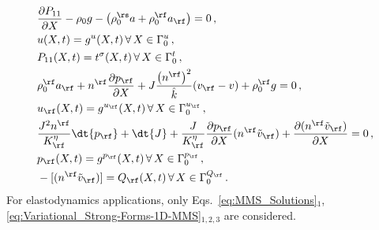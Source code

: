 \begin{align}
\label{eq:Variational_Strong-Forms-1D-MMS}
    \begin{aligned}
        &\frac{\partial P_{11}}{\partial X} - \rho_0g - \left(\rho_0^\rs a + \rho_0^\rf a_\rf\right) = 0\, ,\\
        &u(X, t) = g^u(X,t)\, \forall \, X \in \Gamma_0^u\, ,\\
        &P_{11}(X, t) = t^\sigma(X,t) \, \forall \, X \in \Gamma_0^t\, ,\\
        &\rho_0^\rf a_\rf + n^\rf\frac{\partial p_\rf}{\partial X} + J\frac{\left(n^\rf\right)^2}{\hat{k}}(v_\rf - v) + \rho_0^\rf g = 0\, ,\\
        &u_\rf(X,t) = g^{u_\rf}(X,t) \, \forall \, X \in \Gamma_0^{u_\rf}\, ,\\
        &\frac{J^2 n^\rf}{K^\eta_\rf}\dt{p_\rf} + \dt{J} + \frac{J}{K^\eta_\rf}\frac{\partial p_\rf}{\partial X}(n^\rf\tilde{v}_\rf) + \frac{\partial(n^\rf\tilde{v}_\rf)}{\partial X} = 0\, ,\\
        &p_\rf(X,t) = g^{p_\rf}(X,t)\, \forall \, X \in \Gamma_0^{p_\rf}\, ,\\
        &-[(n^\rf\tilde{v}_\rf)] = Q_\rf(X,t)\, \forall \, X \in \Gamma_0^{Q_\rf}\, .
    \end{aligned}
\end{align}
For elastodynamics applications, only Eqs.~\eqref{eq:MMS_Solutions}$_1$,\eqref{eq:Variational_Strong-Forms-1D-MMS}$_{1,2,3}$ are considered.\\

